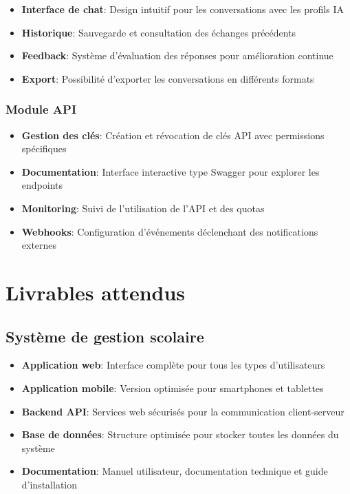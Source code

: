 \begin{itemize}
  \item \textbf{Interface de chat}: Design intuitif pour les conversations avec les profils IA
  
  \item \textbf{Historique}: Sauvegarde et consultation des échanges précédents
  
  \item \textbf{Feedback}: Système d'évaluation des réponses pour amélioration continue
  
  \item \textbf{Export}: Possibilité d'exporter les conversations en différents formats
\end{itemize}

\subsubsection{Module API}

\begin{itemize}
  \item \textbf{Gestion des clés}: Création et révocation de clés API avec permissions spécifiques
  
  \item \textbf{Documentation}: Interface interactive type Swagger pour explorer les endpoints
  
  \item \textbf{Monitoring}: Suivi de l'utilisation de l'API et des quotas
  
  \item \textbf{Webhooks}: Configuration d'événements déclenchant des notifications externes
\end{itemize}

\section{Livrables attendus}

\subsection{Système de gestion scolaire}

\begin{itemize}
  \item \textbf{Application web}: Interface complète pour tous les types d'utilisateurs
  
  \item \textbf{Application mobile}: Version optimisée pour smartphones et tablettes
  
  \item \textbf{Backend API}: Services web sécurisés pour la communication client-serveur
  
  \item \textbf{Base de données}: Structure optimisée pour stocker toutes les données du système
  
  \item \textbf{Documentation}: Manuel utilisateur, documentation technique et guide d'installation
\end{itemize}

